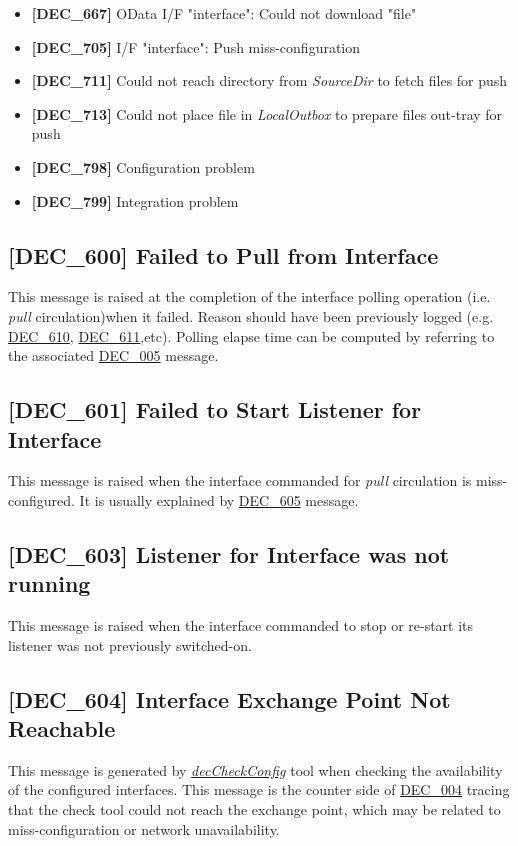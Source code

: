 \documentclass[dec_sum_main.tex]{subfiles}
\begin{document}
\begin{itemize}
	\item \textbf{[DEC\_667]} OData I/F "interface": Could not download "file"
	\item \textbf{[DEC\_705]} I/F "interface": Push miss-configuration
	\item \textbf{[DEC\_711]} Could not reach directory from \textit{SourceDir} to fetch files for push
	\item \textbf{[DEC\_713]} Could not place file in  \textit{LocalOutbox} to prepare files out-tray for push
	\item \textbf{[DEC\_798]} Configuration problem	
	\item \textbf{[DEC\_799]} Integration problem
\end{itemize}

\label{DEC600}
\subsection{[DEC\_600] Failed to Pull from Interface}
This message is raised at the completion of the interface polling operation (i.e. \textit{pull} circulation)when it failed. Reason should have been previously logged (e.g. \hyperref[DEC610]{DEC\_610}, \hyperref[DEC611]{DEC\_611},etc). Polling elapse time can be computed by referring to the associated \hyperref[DEC005]{DEC\_005} message. 

\label{DEC601}
\subsection{[DEC\_601] Failed to Start Listener for Interface}
This message is raised when the interface commanded for \textit{pull} circulation is miss-configured. It is usually explained by \hyperref[DEC605]{DEC\_605} message. 

\label{DEC603}
\subsection{[DEC\_603] Listener for Interface was not running}
This message is raised when the interface commanded to stop or re-start its listener was not previously switched-on.

\label{DEC604}
\subsection{[DEC\_604] Interface Exchange Point Not Reachable}
This message is generated by \hyperref[decCheckConfig]{\textit{decCheckConfig}} tool when checking the availability of the configured interfaces. This message is the counter side of \hyperref[DEC004]{DEC\_004} tracing that the check tool could not reach the exchange point, which may be related to miss-configuration or network unavailability.
\end{document}
